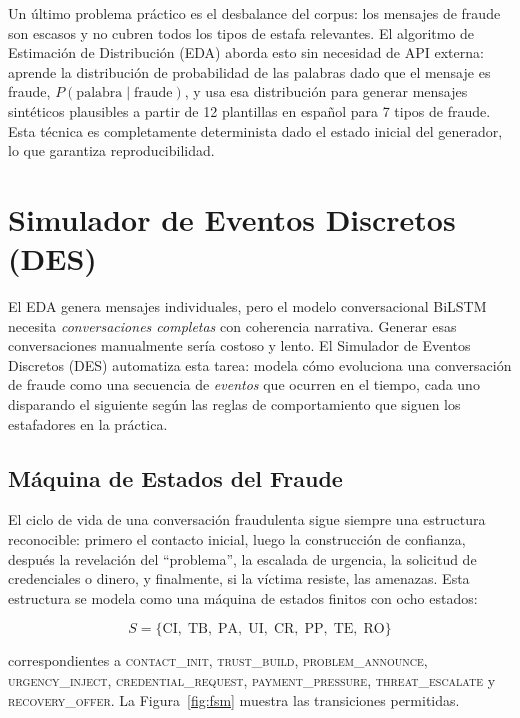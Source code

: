\documentclass{llncs}
\begin{document}
Un último problema práctico es el desbalance del corpus:
los mensajes de fraude son escasos y no cubren todos los tipos
de estafa relevantes.
El algoritmo de Estimación de Distribución (EDA) aborda esto
sin necesidad de API externa: aprende la distribución de
probabilidad de las palabras dado que el mensaje es fraude,
$P(\text{palabra} \mid \text{fraude})$, y usa esa distribución
para generar mensajes sintéticos plausibles a partir de
12 plantillas en español para 7 tipos de fraude.
Esta técnica es completamente determinista dado el estado inicial
del generador, lo que garantiza reproducibilidad.

\section{Simulador de Eventos Discretos (DES)}
\label{sec:des}

El EDA genera mensajes individuales, pero el modelo conversacional
BiLSTM necesita \emph{conversaciones completas} con coherencia
narrativa.
Generar esas conversaciones manualmente sería costoso y lento.
El Simulador de Eventos Discretos (DES) automatiza esta tarea:
modela cómo evoluciona una conversación de fraude como una
secuencia de \emph{eventos} que ocurren en el tiempo, cada uno
disparando el siguiente según las reglas de comportamiento que
siguen los estafadores en la práctica.

\subsection{Máquina de Estados del Fraude}
\label{sec:des:fsm}

El ciclo de vida de una conversación fraudulenta sigue siempre
una estructura reconocible: primero el contacto inicial,
luego la construcción de confianza, después la revelación del
``problema'', la escalada de urgencia, la solicitud de credenciales
o dinero, y finalmente, si la víctima resiste, las amenazas.
Esta estructura se modela como una máquina de estados finitos
con ocho estados:

\begin{equation}
  S = \bigl\{
    \mathrm{CI},\; \mathrm{TB},\; \mathrm{PA},\; \mathrm{UI},\;
    \mathrm{CR},\; \mathrm{PP},\; \mathrm{TE},\; \mathrm{RO}
  \bigr\}
  \label{eq:states}
\end{equation}

correspondientes a \textsc{contact\_init}, \textsc{trust\_build},
\textsc{problem\_announce}, \textsc{urgency\_inject},
\textsc{credential\_request}, \textsc{payment\_pressure},
\textsc{threat\_escalate} y \textsc{recovery\_offer}.
La Figura~\ref{fig:fsm} muestra las transiciones permitidas.
\end{document}
